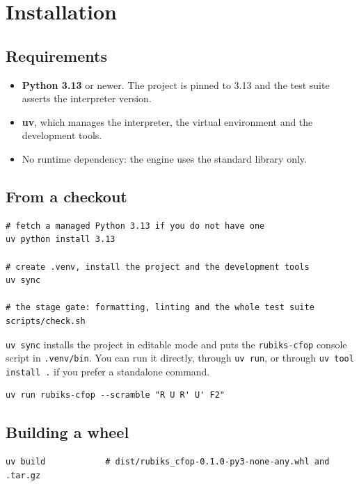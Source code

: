 \section{Installation}
\label{sec:install}

\subsection{Requirements}

\begin{itemize}[leftmargin=1.4em]
  \item \textbf{Python 3.13} or newer.  The project is pinned to 3.13 and the
        test suite asserts the interpreter version.
  \item \textbf{uv}, which manages the interpreter, the virtual environment and the
        development tools.
  \item No runtime dependency: the engine uses the standard library only.
\end{itemize}

\subsection{From a checkout}

\begin{lstlisting}[style=shell]
# fetch a managed Python 3.13 if you do not have one
uv python install 3.13

# create .venv, install the project and the development tools
uv sync

# the stage gate: formatting, linting and the whole test suite
scripts/check.sh
\end{lstlisting}

\texttt{uv sync} installs the project in editable mode and puts the
\texttt{rubiks-cfop} console script in \texttt{.venv/bin}.  You can run it directly,
through \texttt{uv run}, or through \texttt{uv tool install .} if you prefer a
standalone command.

\begin{lstlisting}[style=shell]
uv run rubiks-cfop --scramble "R U R' U' F2"
\end{lstlisting}

\subsection{Building a wheel}

\begin{lstlisting}[style=shell]
uv build            # dist/rubiks_cfop-0.1.0-py3-none-any.whl and .tar.gz
\end{lstlisting}

